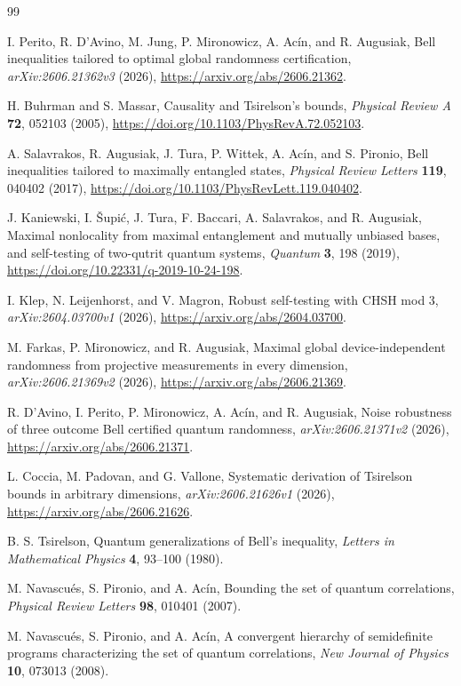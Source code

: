 \documentclass[11pt]{article}
\theoremstyle{remark}
\begin{document}
\begin{thebibliography}{99}

I. Perito, R. D'Avino, M. Jung, P. Mironowicz, A. Ac\'in, and R. Augusiak,
\newblock Bell inequalities tailored to optimal global randomness
  certification,
\newblock \emph{arXiv:2606.21362v3} (2026),
\newblock \url{https://arxiv.org/abs/2606.21362}.

H. Buhrman and S. Massar,
\newblock Causality and Tsirelson's bounds,
\newblock \emph{Physical Review A} \textbf{72}, 052103 (2005),
\newblock \url{https://doi.org/10.1103/PhysRevA.72.052103}.

A. Salavrakos, R. Augusiak, J. Tura, P. Wittek, A. Ac\'in, and S. Pironio,
\newblock Bell inequalities tailored to maximally entangled states,
\newblock \emph{Physical Review Letters} \textbf{119}, 040402 (2017),
\newblock \url{https://doi.org/10.1103/PhysRevLett.119.040402}.

J. Kaniewski, I. \v{S}upi\'c, J. Tura, F. Baccari, A. Salavrakos,
and R. Augusiak,
\newblock Maximal nonlocality from maximal entanglement and mutually unbiased
bases, and self-testing of two-qutrit quantum systems,
\newblock \emph{Quantum} \textbf{3}, 198 (2019),
\newblock \url{https://doi.org/10.22331/q-2019-10-24-198}.

I. Klep, N. Leijenhorst, and V. Magron,
\newblock Robust self-testing with CHSH mod 3,
\newblock \emph{arXiv:2604.03700v1} (2026),
\newblock \url{https://arxiv.org/abs/2604.03700}.

M. Farkas, P. Mironowicz, and R. Augusiak,
\newblock Maximal global device-independent randomness from projective
measurements in every dimension,
\newblock \emph{arXiv:2606.21369v2} (2026),
\newblock \url{https://arxiv.org/abs/2606.21369}.

R. D'Avino, I. Perito, P. Mironowicz, A. Ac\'in, and R. Augusiak,
\newblock Noise robustness of three outcome Bell certified quantum randomness,
\newblock \emph{arXiv:2606.21371v2} (2026),
\newblock \url{https://arxiv.org/abs/2606.21371}.

L. Coccia, M. Padovan, and G. Vallone,
\newblock Systematic derivation of Tsirelson bounds in arbitrary dimensions,
\newblock \emph{arXiv:2606.21626v1} (2026),
\newblock \url{https://arxiv.org/abs/2606.21626}.

B. S. Tsirelson,
\newblock Quantum generalizations of Bell's inequality,
\newblock \emph{Letters in Mathematical Physics} \textbf{4}, 93--100 (1980).

M. Navascu\'es, S. Pironio, and A. Ac\'in,
\newblock Bounding the set of quantum correlations,
\newblock \emph{Physical Review Letters} \textbf{98}, 010401 (2007).

M. Navascu\'es, S. Pironio, and A. Ac\'in,
\newblock A convergent hierarchy of semidefinite programs characterizing the
  set of quantum correlations,
\newblock \emph{New Journal of Physics} \textbf{10}, 073013 (2008).

\end{thebibliography}
\end{document}
